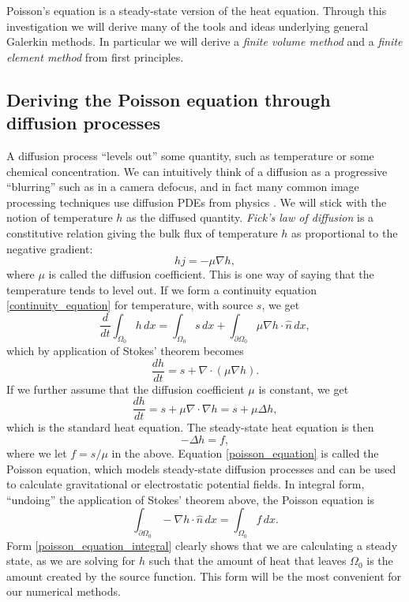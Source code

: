 \documentclass[11pt,a4paper]{memoir}
\newcommand{\omn}{{\Omega_0}}
\newcommand{\pomn}{{\partial\Omega_0}}
\begin{document}
Poisson's equation is a steady-state version of the heat equation.
Through this investigation we will derive many of the tools and ideas underlying general Galerkin methods.
In particular we will derive a \textit{finite volume method} and a \textit{finite element method} from first principles.

\subsection{Deriving the Poisson equation through diffusion processes}
A diffusion process ``levels out'' some quantity, such as temperature or some chemical concentration. We can intuitively think of a diffusion as a
progressive ``blurring''
such as in a camera defocus, and in fact many common image processing techniques use diffusion PDEs from physics \cite{tum}. We will stick with
the notion of temperature $h$ as the diffused quantity.
\textit{Fick's law of diffusion} is a constitutive relation giving the bulk flux of temperature $h$ as proportional to the negative gradient:
    $$hj = -\mu\nabla h,$$
where $\mu$ is called the diffusion coefficient.
This is one way of saying that the temperature tends to level out.
If we form a continuity equation \eqref{continuity_equation} for temperature, with source $s$, we get
\begin{equation}\label{heat_equation_integral}
    \frac{d}{dt} \int_{\Omega_0} h\,dx = \int_{\Omega_0} s\,dx + \int_{\pomn} \mu \nabla h \cdot \hat{n}\,dx,
\end{equation}
which by application of Stokes' theorem becomes
\begin{equation}\label{heat_equation_differential}
    \frac{dh}{dt} = s + \nabla \cdot \left(\mu \nabla h\right).
\end{equation}
If we further assume that the diffusion coefficient $\mu$ is constant, we get
\begin{equation}\label{heat_equation_differential_constant}
    \frac{dh}{dt} = s + \mu\nabla \cdot \nabla h = s + \mu\Delta h,
\end{equation}
which is the standard heat equation.
The steady-state heat equation is then
\begin{equation}\label{poisson_equation}
    -\Delta h = f,
\end{equation}
where we let $f = s/\mu$ in the above. Equation \eqref{poisson_equation} is called the Poisson equation,
which models steady-state diffusion processes and can be used to calculate gravitational or electrostatic potential fields.
In integral form, ``undoing'' the application of Stokes' theorem above, the Poisson equation is
\begin{equation}\label{poisson_equation_integral}
    \int_{\pomn} -\nabla h\cdot \hat{n}\,dx = \int_{\omn} f\,dx.
\end{equation}
Form \eqref{poisson_equation_integral} clearly shows that we are calculating a steady state,
as we are solving for $h$ such that the amount of heat that leaves $\Omega_0$ is the amount created by the source function.
This form will be the most convenient for our numerical methods.
\end{document}
